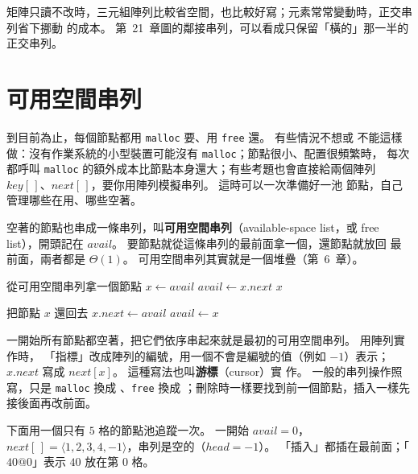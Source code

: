 矩陣只讀不改時，三元組陣列比較省空間，也比較好寫；元素常常變動時，正交串列省下挪動
的成本。 第~21~章圖的鄰接串列，可以看成只保留「橫的」那一半的正交串列。

\section{可用空間串列}
\label{sec:ll-avail}

到目前為止，每個節點都用 \texttt{malloc} 要、用 \texttt{free} 還。 有些情況不想或
不能這樣做：沒有作業系統的小型裝置可能沒有 \texttt{malloc}；節點很小、配置很頻繁時，
每次都呼叫 \texttt{malloc} 的額外成本比節點本身還大；有些考題也會直接給兩個陣列
$\mathit{key}[\,]$、$\mathit{next}[\,]$，要你用陣列模擬串列。 這時可以一次準備好一池
節點，自己管理哪些在用、哪些空著。

空著的節點也串成一條串列，叫\textbf{可用空間串列}（available-space list，或 free
list），開頭記在 $\mathit{avail}$。 要節點就從這條串列的最前面拿一個，還節點就放回
最前面，兩者都是 $\Theta(1)$。 可用空間串列其實就是一個堆疊（第~6~章）。

\begin{pseudo}[label=alg:ll-getnode, unbreakable]{從可用空間串列拿一個節點}
        \State {}
    \EndIf
    \State $x \gets \mathit{avail}$
    \State $\mathit{avail} \gets x.\mathit{next}$
    \State \Return $x$
\EndFunction
\end{pseudo}

\begin{pseudo}[label=alg:ll-retnode]{把節點 $x$ 還回去}
    \State $x.\mathit{next} \gets \mathit{avail}$
    \State $\mathit{avail} \gets x$
\EndProcedure
\end{pseudo}

一開始所有節點都空著，把它們依序串起來就是最初的可用空間串列。 用陣列實作時，
「指標」改成陣列的編號，\NIL 用一個不會是編號的值（例如 $-1$）表示；
$x.\mathit{next}$ 寫成 $\mathit{next}[x]$。 這種寫法也叫\textbf{游標}（cursor）實
作。 一般的串列操作照寫，只是 \texttt{malloc} 換成 、\texttt{free}
換成 ；刪除時一樣要找到前一個節點，插入一樣先接後面再改前面。

下面用一個只有 $5$ 格的節點池追蹤一次。 一開始 $\mathit{avail} = 0$，
$\mathit{next}[\,] = \langle 1, 2, 3, 4, -1 \rangle$，串列是空的（$\mathit{head} =
-1$）。 「插入」都插在最前面；「$40@0$」表示 $40$ 放在第 $0$ 格。

